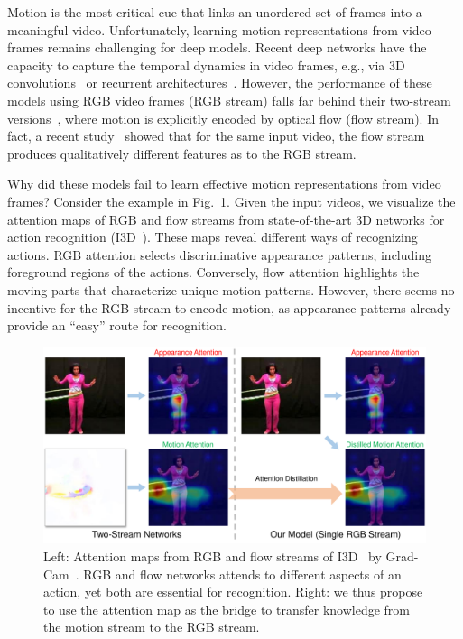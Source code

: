\documentclass[10pt,twocolumn,letterpaper]{article}
\begin{document}
Motion is the most critical cue that links an unordered set of frames into a meaningful video. Unfortunately, learning motion representations from video frames remains challenging for deep models. Recent deep networks have the capacity to capture the temporal dynamics in video frames, e.g., via 3D convolutions~\cite{tran2015learning} or recurrent architectures~\cite{donahue2015long}. However, the performance of these models using RGB video frames (RGB stream) falls far behind their two-stream versions~\cite{donahue2015long,carreira2017quo}, where motion is explicitly encoded by optical flow (flow stream). In fact, a recent study~\cite{Feichtenhofer_2018_CVPR} showed that for the same input video, the flow stream produces qualitatively different features as to the RGB stream.

Why did these models fail to learn effective motion representations from video frames? Consider the example in Fig.\ \ref{fig:teaser}. Given the input videos, we visualize the attention maps of RGB and flow streams from state-of-the-art 3D networks for action recognition (I3D~\cite{carreira2017quo}). These maps reveal different ways of recognizing actions. RGB attention selects discriminative appearance patterns, including foreground regions of the actions. Conversely, flow attention highlights the moving parts that characterize unique motion patterns. However, there seems no incentive for the RGB stream to encode motion, as appearance patterns already provide an ``easy'' route for recognition. 

\begin{figure}[t]
\centering
\includegraphics[width=0.9\linewidth]{latex/figures/teaser_new.pdf}
\caption{Left: Attention maps from RGB and flow streams of I3D~\cite{carreira2017quo} by Grad-Cam~\cite{selvaraju2017grad}. RGB and flow networks attends to different aspects of an action, yet both are essential for recognition. Right: we thus propose to use the attention map as the bridge to transfer knowledge from the motion stream to the RGB stream.} 
\label{fig:teaser}
\vspace{-1.2em}
\end{figure}
\end{document}
